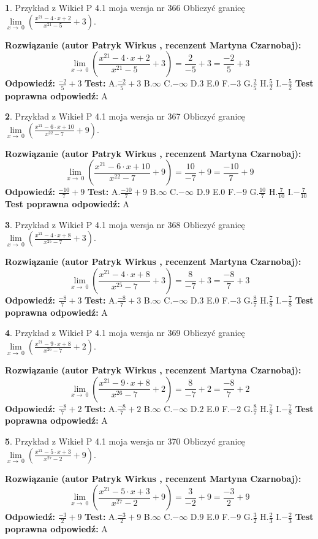\documentclass[12pt, a4paper]{article}
\theoremstyle{definition} %
\newtheorem{zad}{}
\newcommand{\zadStart}[1]{\begin{zad}#1\newline}
\newcommand{\zadStop}{\end{zad}}
\newcommand{\rozwStart}[2]{\noindent \textbf{Rozwiązanie (autor #1 , recenzent #2): }\newline}
\newcommand{\rozwStop}{\newline}
\newcommand{\odpStart}{\noindent \textbf{Odpowiedź:}\newline}
\newcommand{\odpStop}{\newline}
\newcommand{\testStart}{\noindent \textbf{Test:}\newline}
\newcommand{\testStop}{\newline}
\newcommand{\kluczStart}{\noindent \textbf{Test poprawna odpowiedź:}\newline}
\newcommand{\kluczStop}{\newline}
\begin{document}
\zadStart{Przykład z Wikieł P 4.1 moja wersja nr 366}
Obliczyć granicę $\lim\limits_{x\to\ 0}(\frac{x^{21}-4 \cdot x +2}{x^{21}-5}+3)$.
\zadStop
\rozwStart{Patryk Wirkus}{Martyna Czarnobaj}
$$\lim\limits_{x\to\ 0}(\frac{x^{21}-4 \cdot x +2}{x^{21}-5}+3)=\frac{2}{-5}+3=\frac{-2}{5}+3$$
\rozwStop
\odpStart
$\frac{-2}{5}+3$
\odpStop
\testStart
A.$\frac{-2}{5}+3$
B.$\infty$
C.$-\infty$
D.$3$
E.$0$
F.$-3$
G.$\frac{2}{5}$
H.$\frac{5}{2}$
I.$-\frac{5}{2}$
\testStop
\kluczStart
A
\kluczStop



\zadStart{Przykład z Wikieł P 4.1 moja wersja nr 367}
Obliczyć granicę $\lim\limits_{x\to\ 0}(\frac{x^{21}-6 \cdot x +10}{x^{22}-7}+9)$.
\zadStop
\rozwStart{Patryk Wirkus}{Martyna Czarnobaj}
$$\lim\limits_{x\to\ 0}(\frac{x^{21}-6 \cdot x +10}{x^{22}-7}+9)=\frac{10}{-7}+9=\frac{-10}{7}+9$$
\rozwStop
\odpStart
$\frac{-10}{7}+9$
\odpStop
\testStart
A.$\frac{-10}{7}+9$
B.$\infty$
C.$-\infty$
D.$9$
E.$0$
F.$-9$
G.$\frac{10}{7}$
H.$\frac{7}{10}$
I.$-\frac{7}{10}$
\testStop
\kluczStart
A
\kluczStop



\zadStart{Przykład z Wikieł P 4.1 moja wersja nr 368}
Obliczyć granicę $\lim\limits_{x\to\ 0}(\frac{x^{21}-4 \cdot x +8}{x^{25}-7}+3)$.
\zadStop
\rozwStart{Patryk Wirkus}{Martyna Czarnobaj}
$$\lim\limits_{x\to\ 0}(\frac{x^{21}-4 \cdot x +8}{x^{25}-7}+3)=\frac{8}{-7}+3=\frac{-8}{7}+3$$
\rozwStop
\odpStart
$\frac{-8}{7}+3$
\odpStop
\testStart
A.$\frac{-8}{7}+3$
B.$\infty$
C.$-\infty$
D.$3$
E.$0$
F.$-3$
G.$\frac{8}{7}$
H.$\frac{7}{8}$
I.$-\frac{7}{8}$
\testStop
\kluczStart
A
\kluczStop



\zadStart{Przykład z Wikieł P 4.1 moja wersja nr 369}
Obliczyć granicę $\lim\limits_{x\to\ 0}(\frac{x^{21}-9 \cdot x +8}{x^{26}-7}+2)$.
\zadStop
\rozwStart{Patryk Wirkus}{Martyna Czarnobaj}
$$\lim\limits_{x\to\ 0}(\frac{x^{21}-9 \cdot x +8}{x^{26}-7}+2)=\frac{8}{-7}+2=\frac{-8}{7}+2$$
\rozwStop
\odpStart
$\frac{-8}{7}+2$
\odpStop
\testStart
A.$\frac{-8}{7}+2$
B.$\infty$
C.$-\infty$
D.$2$
E.$0$
F.$-2$
G.$\frac{8}{7}$
H.$\frac{7}{8}$
I.$-\frac{7}{8}$
\testStop
\kluczStart
A
\kluczStop



\zadStart{Przykład z Wikieł P 4.1 moja wersja nr 370}
Obliczyć granicę $\lim\limits_{x\to\ 0}(\frac{x^{21}-5 \cdot x +3}{x^{27}-2}+9)$.
\zadStop
\rozwStart{Patryk Wirkus}{Martyna Czarnobaj}
$$\lim\limits_{x\to\ 0}(\frac{x^{21}-5 \cdot x +3}{x^{27}-2}+9)=\frac{3}{-2}+9=\frac{-3}{2}+9$$
\rozwStop
\odpStart
$\frac{-3}{2}+9$
\odpStop
\testStart
A.$\frac{-3}{2}+9$
B.$\infty$
C.$-\infty$
D.$9$
E.$0$
F.$-9$
G.$\frac{3}{2}$
H.$\frac{2}{3}$
I.$-\frac{2}{3}$
\testStop
\kluczStart
A
\kluczStop
\end{document}

